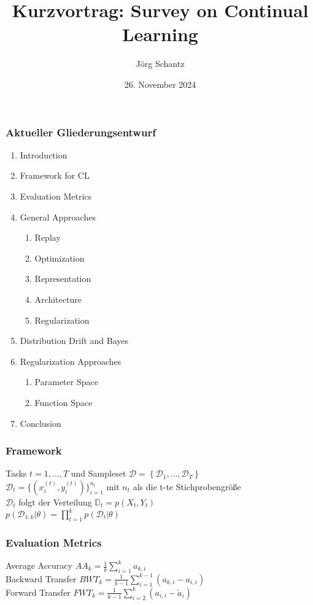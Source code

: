 \documentclass{beamer}
\title{Kurzvortrag: Survey on Continual Learning}
\author{Jörg Schantz}
\date{26. November 2024}
\begin{document}
\begin{frame}[plain]
    \maketitle
\end{frame}
\begin{frame}
    \frametitle{Aktueller Gliederungsentwurf}
    \begin{enumerate}
    	\item Introduction
    	\item Framework for CL
    	\item Evaluation Metrics
    	\item General Approaches
    	\begin{enumerate}
    		\item Replay
    		\item Optimization
    		\item Representation
    		\item Architecture
    		\item Regularization
    	\end{enumerate}
    	\item Distribution Drift and Bayes
    	\item Regularization Approaches
    	\begin{enumerate}
    		\item Parameter Space
    		\item Function Space
    	\end{enumerate}
    	\item Conclusion
 	\end{enumerate}
\end{frame}
\begin{frame}
	\frametitle{Framework}
	Tasks $t = 1, ..., T$ und Sampleset $\mathcal{D} = \left\lbrace \mathcal{D}_1, ..., \mathcal{D}_T\right\rbrace$
	\\
	\vspace{0.5cm}
	$\mathcal{D}_t = \lbrace (x_i^{(t)},y_i^{(t)}) \rbrace_{i=1}^{n_t}$ mit $n_t$ als die t-te Stichprobengröße
	\\
	\vspace{0.5cm}
	$\mathcal{D}_t$ folgt der Verteilung $\mathbb{D}_t = p(X_t, Y_t)$ 
	\\
	\vspace{0.5cm}
	$p(\mathcal{D}_{1:k}|\theta) = \prod_{t=1}^{k}p(\mathcal{D}_t|\theta)$
\end{frame}
\begin{frame}
	\frametitle{Evaluation Metrics}
	Average Accuracy $AA_k=\frac{1}{k}\sum_{i=1}^{k}a_{k,i}$
	\\
	\vspace{0.5cm}
	Backward Transfer $BWT_k = \frac{1}{k-1}\sum_{i=1}^{k-1}(a_{k,i}-a_{i,i})$
	\\
	\vspace{0.5cm}
	Forward Transfer $FWT_k = \frac{1}{k-1}\sum_{i=2}^{k}(a_{i,i}-\tilde{a}_i)$
\end{frame}
\end{document}
